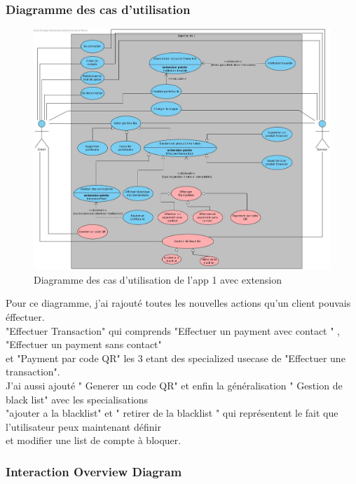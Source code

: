 \documentclass[../rapport.tex]{subfiles}
\begin{document}
		\subsubsection{Diagramme des cas d'utilisation}
				\begin{figure}[h]
						\centering\includegraphics[scale=0.27]{ressources/photos_diagrammes/extensionChristian/usecaseapp1/usecaseapp1.jpg}
						\caption{Diagramme des cas d'utilisation de l'app 1 avec extension}
				\end{figure}
		Pour ce diagramme, j'ai rajouté toutes les nouvelles actions qu'un client pouvais éffectuer.\\
        "Effectuer Transaction" qui comprends "Effectuer un payment avec contact " , "Effectuer un payment sans contact"\\
        et "Payment par code QR" les 3 etant des specialized usecase de "Effectuer une transaction".\\
        J'ai aussi ajouté " Generer un code QR"  et enfin la généralisation " Gestion de black list" avec les specialisations\\
        "ajouter a la blacklist" et " retirer de la blacklist " qui représentent le fait que l'utilisateur peux maintenant définir\\
        et modifier une list de compte à bloquer.
\newpage
		\subsubsection{Interaction Overview Diagram}
			
\end{document}
